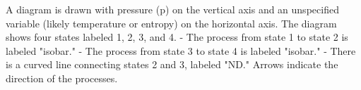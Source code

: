 A diagram is drawn with pressure (p) on the vertical axis and an unspecified variable (likely temperature or entropy) on the horizontal axis. The diagram shows four states labeled 1, 2, 3, and 4.  
- The process from state 1 to state 2 is labeled "isobar."  
- The process from state 3 to state 4 is labeled "isobar."  
- There is a curved line connecting states 2 and 3, labeled "ND."  
Arrows indicate the direction of the processes.